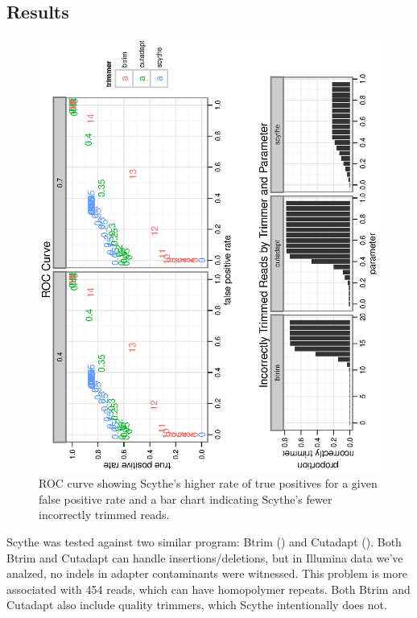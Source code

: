 \documentclass{bioinfo}
\begin{document}
\begin{methods}
\section{Results}
\begin{centering}
\begin{figure}[!tpb]
\includegraphics[angle=-90]{graphics/roc-and-incorrect-trimmed.eps}
\caption{ROC curve showing Scythe's higher rate of true positives for
  a given false positive rate and a bar chart indicating Scythe's
  fewer incorrectly trimmed reads.}\label{fig:02}
\end{figure}
\end{centering}

Scythe was tested against two similar program: Btrim
(\citealp{pmid21651976}) and Cutadapt (\citealp{pmid19737799}). Both
Btrim and Cutadapt can handle insertions/deletions, but in Illumina
data we've analzed, no indels in adapter contaminants were
witnessed. This problem is more associated with 454 reads, which can
have homopolymer repeats. Both Btrim and Cutadapt also include quality
trimmers, which Scythe intentionally does not.


\end{methods}
\end{document}
